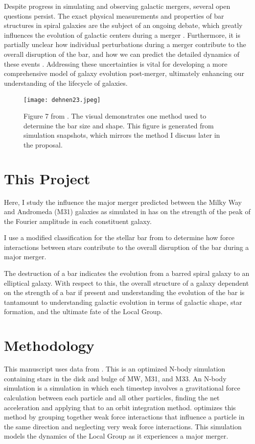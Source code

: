 \documentclass[twocolumn]{aastex631}
\begin{document}
Despite progress in simulating and observing galactic mergers, several
open questions persist. The exact physical measurements and
properties of bar structures in spiral galaxies are the subject of an
ongoing debate, which greatly influences the evolution of galactic
centers during a merger \citep{rathore:25}. Furthermore, it is partially unclear
how individual perturbations during a merger contribute to the overall
disruption of the bar, and how we can predict the detailed dynamics of
these events \citep{berentzen:03}. Addressing these uncertainties is vital for
developing a more comprehensive model of galaxy evolution post-merger,
ultimately enhancing our understanding of the lifecycle of galaxies.

\begin{figure}[htbp]
  \centering
  \texttt{[image: dehnen23.jpeg]}
  \caption{Figure 7 from \citet{dehnen:23}. The visual demonstrates
    one method used to determine the bar size and shape. This figure
    is generated from simulation snapshots, which mirrors the method I
    discuss later in the proposal.}
  \label{fig:dehnen}
\end{figure}

\section{This Project}

Here, I study the influence the major merger predicted between the
Milky Way and Andromeda (M31) galaxies as simulated in
\citet{vandermarel:12} has on the strength of the peak of the Fourier
amplitude in each constituent galaxy.

I use a modified classification for the stellar bar from
\citet{dehnen:23} to determine how force interactions between stars
contribute to the overall disruption of the bar during a major merger.

The destruction of a bar indicates the evolution from a barred spiral
galaxy to an elliptical galaxy. With respect to this, the overall
structure of a galaxy dependent on the strength of a bar if present
and understanding the evolution of the bar is tantamount to
understanding galactic evolution in terms of galactic shape, star
formation, and the ultimate fate of the Local Group.

\section{Methodology}
  \label{methods}
This manuscript uses data from \citet{vandermarel:12}. This is an
optimized N-body simulation containing stars in the disk and bulge of
MW, M31, and M33. An N-body simulation is a simulation in which each
timestep involves a gravitational force calculation between each
particle and all other particles, finding the net acceleration and
applying that to an orbit integration method. \citet{vandermarel:12}
optimizes this method by grouping together weak force interactions
that influence a particle in the same direction and neglecting very
weak force interactions. This simulation models the dynamics of the
Local Group as it experiences a major merger.
\end{document}
